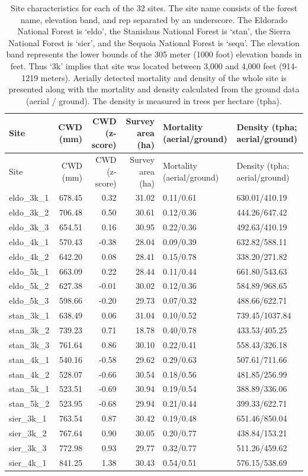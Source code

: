 \documentclass[]{article}
\begin{document}
\begin{longtable}[]{@{}lrrrll@{}}
\caption{Site characteristics for each of the 32 sites. The site name
consists of the forest name, elevation band, and rep separated by an
underscore. The Eldorado National Forest is `eldo', the Stanislaus
National Forest is `stan', the Sierra National Forest is `sier', and the
Sequoia National Forest is `sequ'. The elevation band represents the
lower bounds of the 305 meter (1000 foot) elevation bands in feet. Thus
`3k' implies that site was located between 3,000 and 4,000 feet
(914-1219 meters). Aerially detected mortality and density of the whole
site is presented along with the mortality and density calculated from
the ground data (aerial / ground). The density is measured in trees per
hectare (tpha).}\tabularnewline
\toprule
Site & CWD (mm) & CWD (z-score) & Survey area (ha) & Mortality
(aerial/ground) & Density (tpha; aerial/ground)\tabularnewline
\midrule
\endfirsthead
\toprule
Site & CWD (mm) & CWD (z-score) & Survey area (ha) & Mortality
(aerial/ground) & Density (tpha; aerial/ground)\tabularnewline
\midrule
\endhead
eldo\_3k\_1 & 678.45 & 0.32 & 31.02 & 0.11/0.61 &
630.01/410.19\tabularnewline
eldo\_3k\_2 & 706.48 & 0.50 & 30.61 & 0.12/0.36 &
444.26/647.42\tabularnewline
eldo\_3k\_3 & 654.51 & 0.16 & 30.95 & 0.22/0.36 &
492.63/410.19\tabularnewline
eldo\_4k\_1 & 570.43 & -0.38 & 28.04 & 0.09/0.39 &
632.82/588.11\tabularnewline
eldo\_4k\_2 & 642.20 & 0.08 & 28.41 & 0.15/0.78 &
338.20/271.82\tabularnewline
eldo\_5k\_1 & 663.09 & 0.22 & 28.44 & 0.11/0.44 &
661.80/543.63\tabularnewline
eldo\_5k\_2 & 627.38 & -0.01 & 30.02 & 0.12/0.36 &
584.89/968.65\tabularnewline
eldo\_5k\_3 & 598.66 & -0.20 & 29.73 & 0.07/0.32 &
488.66/622.71\tabularnewline
stan\_3k\_1 & 638.49 & 0.06 & 31.04 & 0.10/0.52 &
739.45/1037.84\tabularnewline
stan\_3k\_2 & 739.23 & 0.71 & 18.78 & 0.40/0.78 &
433.53/405.25\tabularnewline
stan\_3k\_3 & 761.64 & 0.86 & 30.10 & 0.22/0.41 &
558.43/326.18\tabularnewline
stan\_4k\_1 & 540.16 & -0.58 & 29.62 & 0.29/0.63 &
507.61/711.66\tabularnewline
stan\_4k\_2 & 528.07 & -0.66 & 30.54 & 0.18/0.56 &
481.85/256.99\tabularnewline
stan\_5k\_1 & 523.51 & -0.69 & 30.94 & 0.19/0.54 &
388.89/336.06\tabularnewline
stan\_5k\_2 & 523.95 & -0.68 & 29.94 & 0.21/0.44 &
399.33/622.71\tabularnewline
sier\_3k\_1 & 763.54 & 0.87 & 30.42 & 0.19/0.48 &
651.46/850.04\tabularnewline
sier\_3k\_2 & 767.64 & 0.90 & 30.05 & 0.20/0.77 &
438.84/153.21\tabularnewline
sier\_3k\_3 & 772.98 & 0.93 & 29.77 & 0.32/0.77 &
511.26/459.62\tabularnewline
sier\_4k\_1 & 841.25 & 1.38 & 30.43 & 0.54/0.51 &
576.15/538.69\tabularnewline

\end{longtable}
\end{document}

